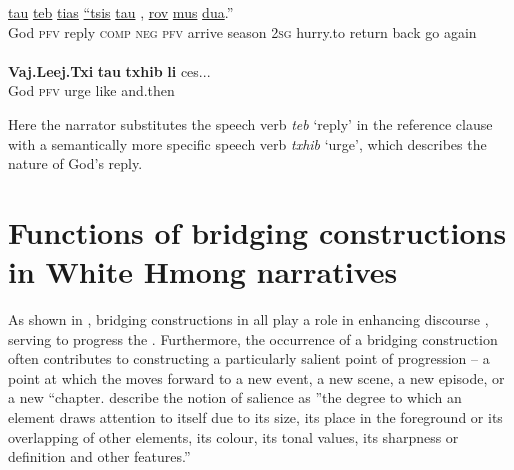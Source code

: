 \documentclass[output=paper]{LSP/langsci}
\begin{document}
\begin{exe}
\ex \label{Jaex:14ab}
\begin{xlist}
\ex \label{Jaex:14a}
\gll  \underline{} \underline{tau} \underline{teb} \underline{tias} \underline{``tsis} \underline{tau}     \underline{} \underline{}, \underline{} \underline{} \underline{rov} \underline{} \underline{mus} \underline{dua}.'' \\
  God \textsc{pfv} reply \textsc{comp} \textsc{neg} \textsc{pfv} arrive season \textsc{2sg} hurry.to return back go again\\
\glt {}\\
\ex \label{Jaex:14b}
\gll \textbf{Vaj.Leej.Txi} \textbf{tau}  \textbf{txhib} \textbf{li} ces... \\     	      
     God \textsc{pfv} urge like and.then\\
\glt {} \citep[][17]{vang90}
\end{xlist}
\end{exe}

\noindent
Here the narrator substitutes the speech verb \textit{teb} `reply' in the reference clause with a semantically more specific speech verb \textit{txhib} `urge', which describes the nature of God’s reply. 


\section{Functions of bridging constructions in White Hmong narratives} 
\label{JaFunctions}
As shown in , bridging constructions in  all play a role in enhancing discourse , serving to progress the . Furthermore, the occurrence of a bridging construction often contributes to constructing a particularly salient point of progression – a point at which the  moves forward to a new event, a new scene, a new episode, or a new ``chapter. \citet[][210]{kress06} describe the notion of salience as ''the degree to which an element draws attention to itself due to its size, its place in the foreground or its overlapping of other elements, its colour, its tonal values, its sharpness or definition and other features.'' 
\end{document}
